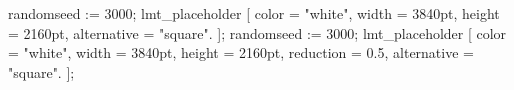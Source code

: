 \startMPpage
  randomseed := 3000;
  lmt_placeholder [
    color = "white",
    width = 3840pt,
    height = 2160pt,
    alternative = "square".
  ];
\stopMPpage
\startMPpage
  randomseed := 3000;
  lmt_placeholder [
    color = "white",
    width = 3840pt,
    height = 2160pt,
    reduction = 0.5,
    alternative = "square".
  ];
\stopMPpage
